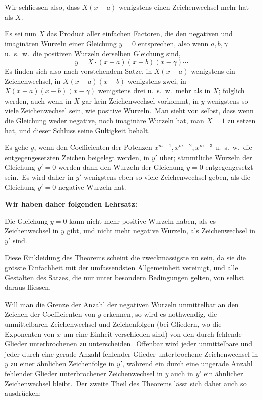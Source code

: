 \documentclass[12pt,a4paper]{article}
\theoremstyle{plain}
\begin{document}
Wir schliessen also, dass $X(x-a)$ wenigstens einen Zeichenwechsel mehr hat
als $X$.

Es sei nun $X$ das Product aller einfachen Factoren, die den negativen und
imaginären Wurzeln einer Gleichung $y = 0$ entsprechen, also wenn $a, b, \gamma$ u.\ s.\ w.\ die positiven Wurzeln derselben Gleichung sind,
\[
y = X \cdot (x-a)(x-b)(x-\gamma) \cdots
\]
Es finden sich also nach vorstehendem Satze, in $X(x-a)$ wenigstens ein Zeichenwechsel, in $X(x-a)(x-b)$ wenigstens zwei, in $X(x-a)(x-b)(x-\gamma)$
wenigstens drei u.\ s.\ w.\ mehr als in $X$; folglich werden, auch wenn in $X$ gar kein
Zeichenwechsel vorkommt, in $y$ wenigstens so viele Zeichenwechsel sein, wie positive Wurzeln.\ Man sieht von selbst, dass wenn die Gleichung weder negative,
noch imaginäre Wurzeln hat, man $X = 1$ zu setzen hat, und dieser Schluss
seine Gültigkeit behält.

Es gehe $y$, wenn den Coefficienten der Potenzen $x^{m-1}, x^{m-2}, x^{m-3}$ u.\ s.\ w.\ die entgegengesetzten Zeichen beigelegt werden, in $y'$ über; sämmtliche Wurzeln der Gleichung $y' = 0$ werden dann den Wurzeln der Gleichung $y = 0$
entgegengesetzt sein.\ Es wird daher in $y'$ wenigstens eben so viele Zeichenwechsel geben, als die Gleichung $y' = 0$ negative Wurzeln hat.

\textbf{Wir haben daher folgenden Lehrsatz:}

Die Gleichung $y = 0$ kann nicht mehr positive Wurzeln haben, als es Zeichenwechsel in $y$ gibt, und nicht mehr negative Wurzeln, als Zeichenwechsel in $y'$
sind.

Diese Einkleidung des Theorems scheint die zweckmässigste zu sein, da sie
die grösste Einfachheit mit der umfassendsten Allgemeinheit vereinigt, und alle
Gestalten des Satzes, die nur unter besondern Bedingungen gelten, von selbst
daraus fliessen.

Will man die Grenze der Anzahl der negativen Wurzeln unmittelbar an den
Zeichen der Coefficienten von $y$ erkennen, so wird es nothwendig, die unmittelbaren Zeichenwechsel und Zeichenfolgen (bei Gliedern, wo die Exponenten von
$x$ um eine Einheit verschieden sind) von den durch fehlende Glieder unterbrochenen zu unterscheiden.\ Offenbar wird jeder unmittelbare und jeder durch eine
 gerade Anzahl fehlender Glieder unterbrochene Zeichenwechsel in $y$ zu einer
ähnlichen Zeichenfolge in $y'$, während ein durch eine ungerade Anzahl fehlender
Glieder unterbrochener Zeichenwechsel in $y$ auch in $y'$ ein ähnlicher Zeichenwechsel bleibt.\ Der zweite Theil des Theorems lässt sich daher auch so ausdrücken:
\end{document}
